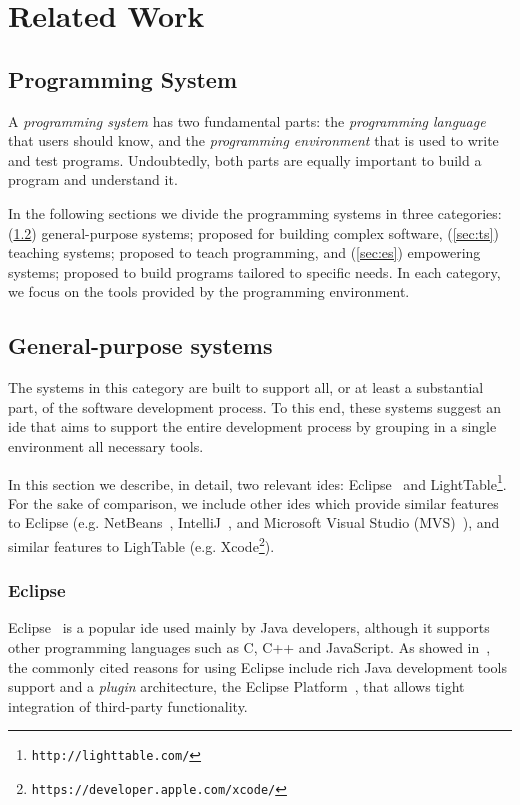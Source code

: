 
\chapter{Related Work}
\label{chapter:relatedWork}

\section{Programming System}
\label{sec:ps}
A \textit{programming system} has two fundamental parts: the \textit{programming language} that users should know, and the \textit{programming environment} that is used to write and test programs. Undoubtedly, both parts are equally important to build a program and understand it.

In the following sections we divide the programming systems in three categories: (\ref{sec:gs}) general-purpose systems; proposed for building complex software, (\ref{sec:ts}) teaching systems; proposed to teach programming, and (\ref{sec:es}) empowering systems; proposed to build programs tailored to specific needs. In each category, we focus on the tools provided by the programming environment.
\section{General-purpose systems}
\label{sec:gs}

The systems in this category are built to support all, or at least a substantial part, of the software development process. To this end, these systems suggest an \gls{ide} that aims to support the entire development process by grouping in a single environment all necessary tools. 

In this section we describe, in detail, two relevant \glspl{ide}: Eclipse~\cite{carlson2005eclipse} and LightTable\footnote{\label{fnote:lt}\texttt{http://lighttable.com/}}. For the sake of comparison, we include other \glspl{ide} which provide similar features to Eclipse (e.g. NetBeans~\cite{boudreau2002netbeans}, IntelliJ~\cite{intellij2001intellij}, and Microsoft Visual Studio (MVS)~\cite{guckenheimer2006software}), and similar features to LighTable (e.g. Xcode\footnote{\texttt{https://developer.apple.com/xcode/}}).
\subsection{Eclipse} 
\label{subsec:eclipse}
Eclipse~\cite{carlson2005eclipse} is a popular \gls{ide} used mainly by Java developers, although it supports other programming languages such as C, C++ and JavaScript. As showed in~\cite{murphy2006java}, the commonly cited reasons for using Eclipse include rich Java development tools support and a \textit{plugin} architecture, the Eclipse Platform~\cite{DesRivieres2004}, that allows tight integration of third-party functionality.

